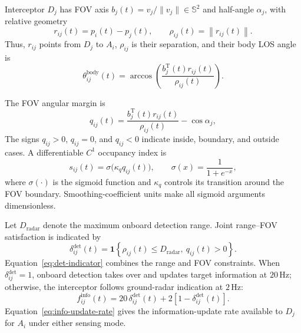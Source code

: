 \documentclass{cja}
\begin{document}
Interceptor $D_j$ has FOV axis $b_j(t)=v_j/\|v_j\|\in\mathbb S^2$ and half-angle $\alpha_j$, with relative geometry
\begin{equation}
r_{ij}(t)=p_i(t)-p_j(t),\qquad
\rho_{ij}(t)=\left\|r_{ij}(t)\right\|.
\end{equation}
Thus, $r_{ij}$ points from $D_j$ to $A_i$, $\rho_{ij}$ is their separation, and their body LOS angle is
\begin{equation}
\theta_{ij}^{\mathrm{body}}(t)
=
\arccos
\left(
\frac{b_j^{\mathrm T}(t)r_{ij}(t)}
{\rho_{ij}(t)}
\right).
\end{equation}

The FOV angular margin is
\begin{equation}
q_{ij}(t)
=
\frac{b_j^{\mathrm T}(t)r_{ij}(t)}
{\rho_{ij}(t)}
-\cos\alpha_j ,
\label{eq:qij-def}
\end{equation}
The signs $q_{ij}>0$, $q_{ij}=0$, and $q_{ij}<0$ indicate inside, boundary, and outside cases. A differentiable $C^1$ occupancy index is
\begin{equation}
s_{ij}(t)
=
\sigma\!\bigl(\kappa_q q_{ij}(t)\bigr),\qquad
\sigma(x)=\frac{1}{1+e^{-x}},
\label{eq:sij-def}
\end{equation}
where $\sigma(\cdot)$ is the sigmoid function and $\kappa_q$ controls its transition around the FOV boundary. Smoothing-coefficient units make all sigmoid arguments dimensionless.

Let $D_{\mathrm{radar}}$ denote the maximum onboard detection range. Joint range--FOV satisfaction is indicated by
\begin{equation}
\delta_{ij}^{\mathrm{det}}(t)
=
\mathbf{1}
\left\{
\rho_{ij}(t)\le D_{\mathrm{radar}},\
q_{ij}(t)>0
\right\}.
\label{eq:det-indicator}
\end{equation}
Equation~\eqref{eq:det-indicator} combines the range and FOV constraints. When $\delta_{ij}^{\mathrm{det}}=1$, onboard detection takes over and updates target information at $20\,\mathrm{Hz}$; otherwise, the interceptor follows ground-radar indication at $2\,\mathrm{Hz}$:
\begin{equation}
f_{ij}^{\mathrm{info}}(t)
=
20\,\delta_{ij}^{\mathrm{det}}(t)
+
2\left[1-\delta_{ij}^{\mathrm{det}}(t)\right].
\label{eq:info-update-rate}
\end{equation}
Equation~\eqref{eq:info-update-rate} gives the information-update rate available to $D_j$ for $A_i$ under either sensing mode.
\end{document}
